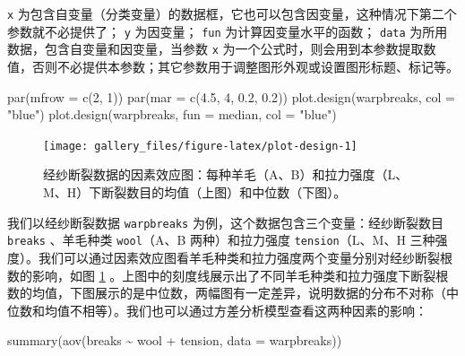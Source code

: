 \documentclass[
  b5paper,
  UTF8,twoside]{book}
\newenvironment{Shaded}{\begin{snugshade}}{\end{snugshade}}
\newcommand{\AttributeTok}[1]{\textcolor[rgb]{0.77,0.63,0.00}{#1}}
\newcommand{\DecValTok}[1]{\textcolor[rgb]{0.00,0.00,0.81}{#1}}
\newcommand{\FloatTok}[1]{\textcolor[rgb]{0.00,0.00,0.81}{#1}}
\newcommand{\FunctionTok}[1]{\textcolor[rgb]{0.00,0.00,0.00}{#1}}
\newcommand{\NormalTok}[1]{#1}
\newcommand{\SpecialCharTok}[1]{\textcolor[rgb]{0.00,0.00,0.00}{#1}}
\newcommand{\StringTok}[1]{\textcolor[rgb]{0.31,0.60,0.02}{#1}}
\begin{document}
\texttt{x} 为包含自变量（分类变量）的数据框，它也可以包含因变量，这种情况下第二个参数就不必提供了； \texttt{y} 为因变量； \texttt{fun} 为计算因变量水平的函数； \texttt{data} 为所用数据，包含自变量和因变量，当参数 \texttt{x} 为一个公式时，则会用到本参数提取数值，否则不必提供本参数；其它参数用于调整图形外观或设置图形标题、标记等。





\begin{Shaded}
\begin{Highlighting}[]
\FunctionTok{par}\NormalTok{(}\AttributeTok{mfrow =} \FunctionTok{c}\NormalTok{(}\DecValTok{2}\NormalTok{, }\DecValTok{1}\NormalTok{))}
\FunctionTok{par}\NormalTok{(}\AttributeTok{mar =} \FunctionTok{c}\NormalTok{(}\FloatTok{4.5}\NormalTok{, }\DecValTok{4}\NormalTok{, }\FloatTok{0.2}\NormalTok{, }\FloatTok{0.2}\NormalTok{))}
\FunctionTok{plot.design}\NormalTok{(warpbreaks, }\AttributeTok{col =} \StringTok{"blue"}\NormalTok{)}
\FunctionTok{plot.design}\NormalTok{(warpbreaks, }\AttributeTok{fun =}\NormalTok{ median, }\AttributeTok{col =} \StringTok{"blue"}\NormalTok{)}
\end{Highlighting}
\end{Shaded}

\begin{figure}

{\centering \texttt{[image: gallery\_files/figure-latex/plot-design-1]} 

}

\caption[经纱断裂数据的因素效应图]{经纱断裂数据的因素效应图：每种羊毛（A、B）和拉力强度（L、M、H）下断裂数目的均值（上图）和中位数（下图）。}\label{fig:plot-design}
\end{figure}

我们以经纱断裂数据 \texttt{warpbreaks} 为例，这个数据包含三个变量：经纱断裂数目 \texttt{breaks} 、羊毛种类 \texttt{wool}（A、B 两种）和拉力强度 \texttt{tension}（L、M、H 三种强度）。我们可以通过因素效应图看羊毛种类和拉力强度两个变量分别对经纱断裂根数的影响，如图 \ref{fig:plot-design}
。上图中的刻度线展示出了不同羊毛种类和拉力强度下断裂根数的均值，下图展示的是中位数，两幅图有一定差异，说明数据的分布不对称（中位数和均值不相等）。我们也可以通过方差分析模型查看这两种因素的影响：

\begin{Shaded}
\begin{Highlighting}[]
\FunctionTok{summary}\NormalTok{(}\FunctionTok{aov}\NormalTok{(breaks }\SpecialCharTok{\textasciitilde{}}\NormalTok{ wool }\SpecialCharTok{+}\NormalTok{ tension, }\AttributeTok{data =}\NormalTok{ warpbreaks))}
\end{Highlighting}
\end{Shaded}
\end{document}
